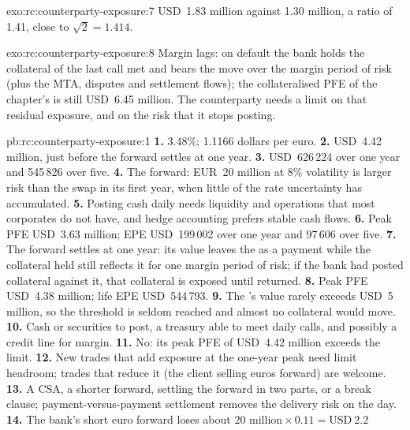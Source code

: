 \begin{solution}{exo:rc:counterparty-exposure:7}
USD~1.83 million against 1.30 million, a ratio of 1.41, close to $\sqrt2 = 1.414$.
\end{solution}

\begin{solution}{exo:rc:counterparty-exposure:8}
Margin lags: on default the bank holds the collateral of the last call met and bears the
move over the margin period of risk (plus the MTA, disputes and settlement flows); the
collateralised PFE of the chapter's  is still USD~6.45 million. The counterparty
needs a limit on that residual exposure, and on the risk that it stops posting.
\end{solution}

\begin{solution}{pb:rc:counterparty-exposure:1}
\textbf{1.} 3.48\%; 1.1166 dollars per euro.
\textbf{2.} USD~4.42 million, just before the forward settles at one year.
\textbf{3.} USD~626\,224 over one year and 545\,826 over five.
\textbf{4.} The forward: EUR~20 million at 8\% volatility is larger risk than the swap in its
first year, when little of the rate uncertainty has accumulated.
\textbf{5.} Posting cash daily needs liquidity and operations that most corporates do not
have, and hedge accounting prefers stable cash flows.
\textbf{6.} Peak PFE USD~3.63 million; EPE USD~199\,002 over one year and 97\,606 over five.
\textbf{7.} The forward settles at one year: its value leaves the  as a payment
while the collateral held still reflects it for one margin period of risk; if the bank had
posted collateral against it, that collateral is exposed until returned.
\textbf{8.} Peak PFE USD~4.38 million; life EPE USD~544\,793.
\textbf{9.} The 's value rarely exceeds USD~5 million, so the threshold is seldom
reached and almost no collateral would move.
\textbf{10.} Cash or securities to post, a treasury able to meet daily calls, and possibly a
credit line for margin.
\textbf{11.} No: its peak PFE of USD~4.42 million exceeds the limit.
\textbf{12.} New trades that add exposure at the one-year peak need limit headroom; trades that
reduce it (the client selling euros forward) are welcome.
\textbf{13.} A CSA, a shorter forward, settling the forward in two parts, or a break clause;
payment-versus-payment settlement removes the delivery risk on the day.
\textbf{14.} The bank's short euro forward loses about $20\text{ million}\times0.11 = \text{USD}~2.2$

\end{solution}
